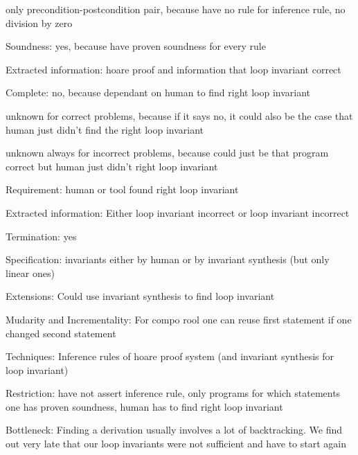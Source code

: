 \documentclass[a4paper]{article}
\begin{document}
\begin{minipage}[t]{0.16\linewidth}
\begin{betterlist}
{{\begin{betterlist}
\begin{enumerate}
\begin{betterlist}
						\end{betterlist}
					\end{enumerate}
					\item only precondition-postcondition pair, because have no rule for inference rule, no division by zero
					\item \alert{Soundness:} yes, because have proven soundness for every rule
					\begin{betterlist}
						\item \alert{Extracted information:} hoare proof and information that loop invariant correct
					\end{betterlist}
					\item \alert{Complete:} no, because dependant on human to find right loop invariant
					\begin{betterlist}
						\item unknown for correct problems, because if it says no, it could also be the case that human just didn't find the right loop invariant
						\item unknown always for incorrect problems, because could just be that program correct but human just didn't right loop invariant
						\item \alert{Requirement:} human or tool found right loop invariant
						\item \alert{Extracted information:} Either loop invariant incorrect or loop invariant incorrect
					\end{betterlist}
					\item \alert{Termination:} yes
					\item \alert{Specification:} invariants either by human or by invariant synthesis (but only linear ones)
					\item \alert{Extensions:} Could use invariant synthesis to find loop invariant
					\item \alert{Mudarity and Incrementality:} For compo rool one can reuse first statement if one changed second statement
					\begin{betterlist}
						\prepostreuse
					\end{betterlist}
					\item \alert{Techniques:} Inference rules of hoare proof system (and invariant synthesis for loop invariant)
					\item \alert{Restriction:} have not assert inference rule, only programs for which statements one has proven soundness, human has to find right loop invariant
					\item \alert{Bottleneck:} Finding a derivation usually involves a lot of backtracking. We find out very late that our loop invariants were not sufficient and have to start again
				\end{betterlist}
			}}
	\end{betterlist}
\end{minipage}
\end{document}

